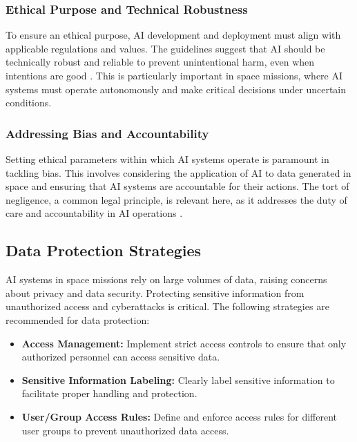 \documentclass[a4paper,12pt]{article}
\begin{document}
\subsubsection{Ethical Purpose and Technical Robustness}

To ensure an ethical purpose, AI development and deployment must align with applicable regulations and values. The guidelines suggest that AI should be technically robust and reliable to prevent unintentional harm, even when intentions are good \cite{ai_hleg_guidelines}. This is particularly important in space missions, where AI systems must operate autonomously and make critical decisions under uncertain conditions.

\subsubsection{Addressing Bias and Accountability}

Setting ethical parameters within which AI systems operate is paramount in tackling bias. This involves considering the application of AI to data generated in space and ensuring that AI systems are accountable for their actions. The tort of negligence, a common legal principle, is relevant here, as it addresses the duty of care and accountability in AI operations \cite{negligence_principle}.

\subsection{Data Protection Strategies}

AI systems in space missions rely on large volumes of data, raising concerns about privacy and data security. Protecting sensitive information from unauthorized access and cyberattacks is critical. The following strategies are recommended for data protection:

\begin{itemize}
    \item \textbf{Access Management:} Implement strict access controls to ensure that only authorized personnel can access sensitive data.
    \item \textbf{Sensitive Information Labeling:} Clearly label sensitive information to facilitate proper handling and protection.
    \item \textbf{User/Group Access Rules:} Define and enforce access rules for different user groups to prevent unauthorized data access.
\end{itemize}
\end{document}
